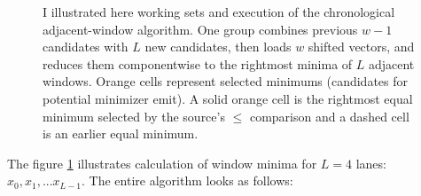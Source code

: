 \begin{figure}[H]
  \caption{I illustrated here working sets and execution of the chronological adjacent-window algorithm.
  One group combines previous $w-1$ candidates with $L$ new
  candidates, then loads $w$ shifted vectors, and reduces them componentwise to the
  rightmost minima of $L$ adjacent windows. Orange cells represent selected minimums (candidates for potential minimizer emit).
  A solid orange cell is the rightmost equal minimum selected by the source's $\leq$ comparison and a dashed cell is an earlier equal
  minimum.}
  \label{fig:rewrite-chronological-groups}
  \end{figure}
  
The figure \ref{fig:rewrite-chronological-groups} illustrates calculation of window minima for $L=4$ lanes: $x_0, x_1, ... x_{L-1}$. The entire algorithm looks as follows:

